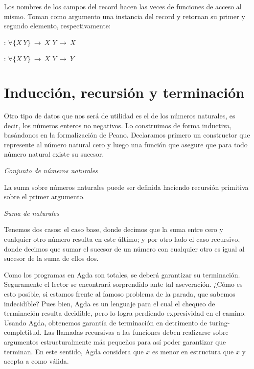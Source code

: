 Los nombres de los campos del record hacen las veces de funciones de acceso al mismo. Toman como argumento una instancia del record y retornan su primer y segundo elemento, respectivamente:

\sangrar
{} : $\forall\{X\ Y\}\ \to\ X$ \AgdaFunction{$\times$} $Y\ \to\ X$

\sangrar
{} : $\forall\{X\ Y\}\ \to\ X$ \AgdaFunction{$\times$} $Y\ \to\ Y$


\section{Inducción, recursión y terminación}

Otro tipo de datos que nos será de utilidad es el de los números naturales, es decir, los números enteros no negativos. Lo construimos de forma inductiva, basándonos en la formalización de Peano.
Declaramos primero un constructor  que represente al número natural cero y luego una función  que asegure que para todo número natural existe su sucesor.

\begin{agdacode}{\it Conjunto de números naturales} \label{code:nat}

\end{agdacode}

La suma sobre números naturales puede ser definida haciendo recursión primitiva sobre el primer argumento.

\begin{agdacode}{\it Suma de naturales} \label{code:suma}

\end{agdacode}

Tenemos dos casos: el caso base, donde decimos que la suma entre cero y cualquier otro número resulta en este último; y por otro lado el caso recursivo, donde decimos que sumar el sucesor de un número con cualquier otro es igual al sucesor de la suma de ellos dos.

Como los programas en Agda son totales, se deberá garantizar su terminación. Seguramente el lector se encontrará sorprendido ante tal aseveración. ¿Cómo es esto posible, si estamos frente al famoso problema de la parada, que sabemos indecidible? Pues bien, Agda es un lenguaje para el cual el chequeo de terminación resulta decidible, pero lo logra perdiendo expresividad en el camino. Usando Agda, obtenemos garantía de terminación en detrimento de turing-completitud. 
Las llamadas recursivas a las funciones deben realizarse sobre argumentos estructuralmente más pequeños para así poder garantizar que terminan. En este sentido, Agda considera que $x$ es menor en estructura que  $x$ y acepta a  como válida.

